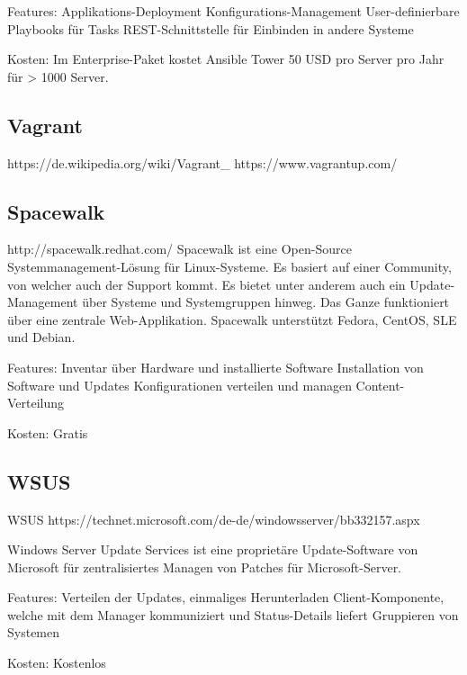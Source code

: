 Features:
Applikations-Deployment
Konfigurations-Management
User-definierbare Playbooks für Tasks
REST-Schnittstelle für Einbinden in andere Systeme

Kosten:
Im Enterprise-Paket kostet Ansible Tower 50 USD pro Server pro Jahr für > 1000 Server.

\subsection{Vagrant}
https://de.wikipedia.org/wiki/Vagrant_%
https://www.vagrantup.com/



\subsection{Spacewalk}
http://spacewalk.redhat.com/
Spacewalk ist eine Open-Source Systemmanagement-Lösung für Linux-Systeme. Es basiert auf einer Community, von welcher auch der Support kommt.
Es bietet unter anderem auch ein Update-Management über Systeme und Systemgruppen hinweg. Das Ganze funktioniert über eine zentrale Web-Applikation.
Spacewalk unterstützt Fedora, CentOS, SLE und Debian.

Features:
Inventar über Hardware und installierte Software
Installation von Software und Updates
Konfigurationen verteilen und managen
Content-Verteilung

Kosten:
Gratis


\subsection{WSUS}

\gls{WSUS}
https://technet.microsoft.com/de-de/windowsserver/bb332157.aspx

Windows Server Update Services ist eine proprietäre Update-Software von Microsoft für zentralisiertes Managen von Patches für Microsoft-Server.

Features:
Verteilen der Updates, einmaliges Herunterladen
Client-Komponente, welche mit dem Manager kommuniziert und Status-Details liefert
Gruppieren von Systemen

Kosten:
Kostenlos
